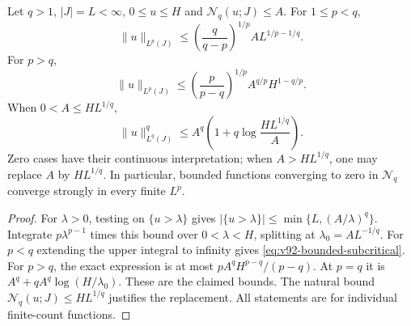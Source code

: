 \begin{lemma}
\label{lem:v92-bounded-critical}
Let $q>1$, $|J|=L<\infty$, $0\le u\le H$ and
$\mathcal N_q(u;J)\le A$. For $1\le p<q$,
\begin{equation}\label{eq:v92-bounded-subcritical}
 \|u\|_{L^p(J)}\le\left(\frac q{q-p}\right)^{1/p}
                                      A L^{1/p-1/q}.
\end{equation}
For $p>q$,
\begin{equation}\label{eq:v92-bounded-supercritical}
 \|u\|_{L^p(J)}\le\left(\frac p{p-q}\right)^{1/p}
                                      A^{q/p}H^{1-q/p}.
\end{equation}
When $0<A\le HL^{1/q}$,
\begin{equation}\label{eq:v92-bounded-endpoint}
 \|u\|_{L^q(J)}^q\le A^q
                     \left(1+q\log\frac{HL^{1/q}}A\right).
\end{equation}
Zero cases have their continuous interpretation; when $A>HL^{1/q}$,
one may replace $A$ by $HL^{1/q}$. In particular, bounded functions
converging to zero in $\mathcal N_q$ converge strongly in every finite
$L^p$.
\end{lemma}
\begin{proof}
For $\lambda>0$, testing on $\{u>\lambda\}$ gives
$|\{u>\lambda\}|\le\min\{L,(A/\lambda)^q\}$.
Integrate $p\lambda^{p-1}$ times this bound over $0<\lambda<H$,
splitting at $\lambda_0=AL^{-1/q}$. For $p<q$ extending the upper
integral to infinity gives \eqref{eq:v92-bounded-subcritical}.
For $p>q$, the exact expression is at most
$pA^qH^{p-q}/(p-q)$. At $p=q$ it is
$A^q+qA^q\log(H/\lambda_0)$. These are the claimed bounds.
The natural bound $\mathcal N_q(u;J)\le HL^{1/q}$ justifies the
replacement. All statements are for individual finite-count functions.
\end{proof}

